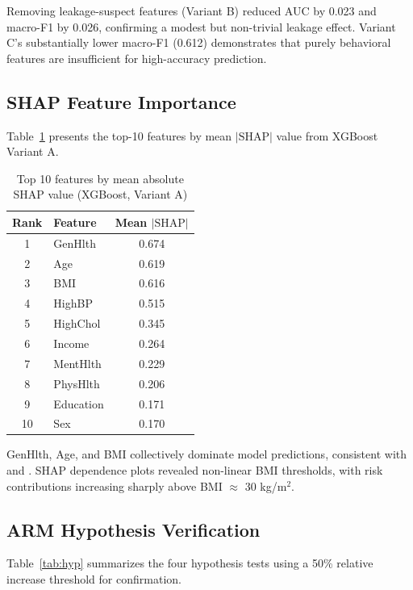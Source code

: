 ﻿\documentclass[12pt,a4paper]{article}
\begin{document}
Removing leakage-suspect features (Variant B) reduced AUC by 0.023 and macro-F1 by 0.026,
confirming a modest but non-trivial leakage effect. Variant C's substantially lower
macro-F1 (0.612) demonstrates that purely behavioral features are insufficient for
high-accuracy prediction.

\subsection{SHAP Feature Importance}

Table~\ref{tab:shap} presents the top-10 features by mean $|\text{SHAP}|$ value from
XGBoost Variant A.

\begin{table}[h]
\centering
\caption{Top 10 features by mean absolute SHAP value (XGBoost, Variant A)}
\label{tab:shap}
\begin{tabular}{clc}
\toprule
\textbf{Rank} & \textbf{Feature} & \textbf{Mean $|\text{SHAP}|$} \\
\midrule
1  & GenHlth   & 0.674 \\
2  & Age       & 0.619 \\
3  & BMI       & 0.616 \\
4  & HighBP    & 0.515 \\
5  & HighChol  & 0.345 \\
6  & Income    & 0.264 \\
7  & MentHlth  & 0.229 \\
8  & PhysHlth  & 0.206 \\
9  & Education & 0.171 \\
10 & Sex       & 0.170 \\
\bottomrule
\end{tabular}
\end{table}

GenHlth, Age, and BMI collectively dominate model predictions, consistent with
\citet{Majcherek2025} and \citet{Kutlu2024}. SHAP dependence plots revealed non-linear
BMI thresholds, with risk contributions increasing sharply above BMI $\approx$ 30 kg/m$^2$.

\subsection{ARM Hypothesis Verification}

Table~\ref{tab:hyp} summarizes the four hypothesis tests using a 50\% relative increase
threshold for confirmation.
\end{document}
